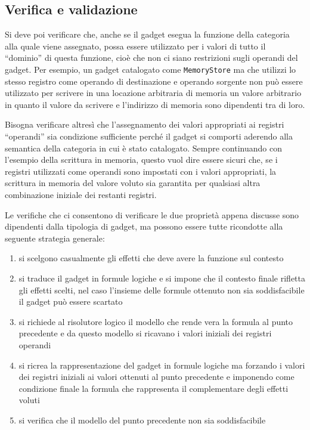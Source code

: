 \subsection{Verifica e validazione}
\label{sec:verifica_validazione}

Si deve poi verificare che, anche se il gadget esegua la funzione
della categoria alla quale viene assegnato, possa essere utilizzato
per i valori di tutto il ``dominio'' di questa funzione, cioè che non
ci siano restrizioni sugli operandi del gadget. Per esempio, un gadget
catalogato come \lstinline{MemoryStore} ma che utilizzi lo stesso
registro come operando di destinazione e operando sorgente non può
essere utilizzato per scrivere in una locazione arbitraria di memoria
un valore arbitrario in quanto il valore da scrivere e l'indirizzo di
memoria sono dipendenti tra di loro.

Bisogna verificare altresì che l'assegnamento dei valori appropriati
ai registri ``operandi'' sia condizione sufficiente perché il gadget
si comporti aderendo alla semantica della categoria in cui è stato
catalogato. Sempre continuando con l'esempio della scrittura in
memoria, questo vuol dire essere sicuri che, se i registri utilizzati
come operandi sono impostati con i valori appropriati, la scrittura in
memoria del valore voluto sia garantita per qualsiasi altra
combinazione iniziale dei restanti registri.


Le verifiche che ci consentono di verificare le due proprietà appena
discusse sono dipendenti dalla tipologia di gadget, ma possono essere
tutte ricondotte alla seguente strategia generale: 
\begin{enumerate}
\item si scelgono casualmente gli effetti che deve avere la funzione
  sul contesto
\item si traduce il gadget in formule logiche e si impone che il
  contesto finale rifletta gli effetti scelti, nel caso l'insieme
  delle formule ottenuto non sia soddisfacibile il gadget può essere
  scartato
\item si richiede al risolutore logico il modello che rende vera la
  formula al punto precedente e da questo modello si ricavano i valori
  iniziali dei registri operandi
\item si ricrea la rappresentazione del gadget in formule logiche ma
  forzando i valori dei registri iniziali ai valori ottenuti al punto
  precedente e imponendo come condizione finale la formula che
  rappresenta il complementare degli effetti voluti
\item si verifica che il modello del punto precedente non sia
  soddisfacibile
\end{enumerate}

